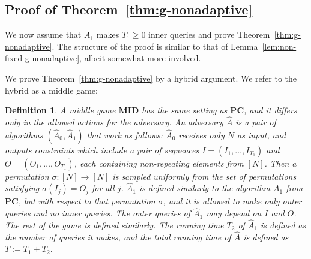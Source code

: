 \documentclass[11pt]{article}
\newtheorem{definition}[theorem]{Definition}
\newcommand{\PC}{\boldsymbol{PC}}
\newcommand{\MID}{\boldsymbol{MID}}
\newcommand{\INP}{I}
\newcommand{\OUTP}{O}
\begin{document}
\subsection{Proof of Theorem~\ref{thm:g-nonadaptive}}
\label{subsec:proof of strong version}
We now assume that $A_1$ makes $T_1 \geq 0$ inner queries and prove Theorem~\ref{thm:g-nonadaptive}.
The structure of the proof is similar to that of Lemma~\ref{lem:non-fixed g-nonadaptive}, albeit somewhat more involved. 

We prove Theorem~\ref{thm:g-nonadaptive} by a hybrid argument. We refer to the hybrid as a middle game:
\begin{definition}\label{def:MID}
    A middle game $\MID$ has the same setting as $\PC$, and it differs only in the allowed actions for the adversary. An adversary $\widehat{A}$ is a pair of algorithms $(\widehat{A}_0, \widehat{A}_1)$ that work as follows: $\widehat{A}_0$ receives only $N$ as input, and outputs \emph{constraints} which include a pair of sequences $\INP = (\INP_1,\dots,\INP_{T_1})$ and $\OUTP = (\OUTP_1,\dots,\OUTP_{T_1})$, each containing non-repeating elements from $[N]$. Then a permutation $\sigma:[N] \to [N]$ is sampled uniformly from the set of permutations satisfying $\sigma(\INP_j) = \OUTP_j$ for all $j$. $\widehat{A}_1$ is defined similarly to the algorithm $A_1$ from $\PC$, but with respect to that permutation $\sigma$, and \emph{it is allowed to make only outer queries and no inner queries}. The outer queries of $\widehat{A}_1$ may depend on $\INP$ and $\OUTP$.
    The rest of the game is defined similarly. The running time $T_2$ of $\widehat{A}_1$ is defined as the number of queries it makes, and the total running time of $\widehat{A}$ is defined as $T := T_1 + T_2$.
\end{definition}
\end{document}
